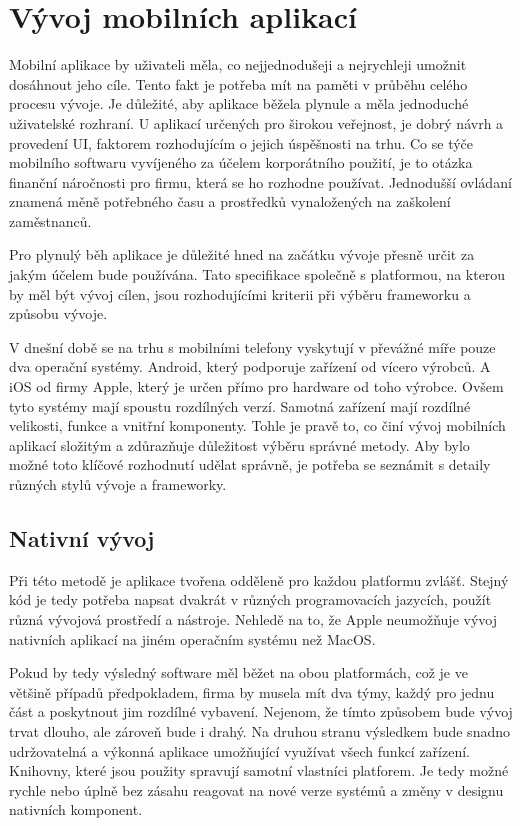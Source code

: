 \documentclass[
  biblatex,
  glossaries,
  index
]{kidiplom}
\begin{document}
\section{Vývoj mobilních aplikací}
Mobilní aplikace by uživateli měla, co nejjednodušeji a nejrychleji umožnit dosáhnout jeho cíle. Tento fakt je potřeba mít na paměti v průběhu celého procesu vývoje. Je důležité, aby aplikace běžela plynule a měla jednoduché uživatelské rozhraní. U aplikací určených pro širokou veřejnost, je dobrý návrh a provedení UI, faktorem rozhodujícím o jejich úspěšnosti na trhu. Co se týče mobilního softwaru vyvíjeného za účelem korporátního použití, je to otázka finanční náročnosti pro firmu, která se ho rozhodne používat. Jednodušší ovládaní znamená měně potřebného času a prostředků vynaložených na zaškolení zaměstnanců.

Pro plynulý běh aplikace je důležité hned na začátku vývoje přesně určit
 za jakým účelem bude používána. Tato specifikace společně s platformou, 
 na kterou by měl být vývoj cílen, jsou rozhodujícími kriterii při výběru frameworku a způsobu vývoje.

V dnešní době se na trhu s mobilními telefony vyskytují v převážné míře pouze dva operační systémy. Android, který podporuje zařízení od vícero výrobců. A iOS od firmy Apple, který je určen přímo pro hardware od toho výrobce. Ovšem tyto systémy mají spoustu rozdílných verzí. Samotná zařízení mají rozdílné velikosti, funkce a vnitřní komponenty. Tohle je pravě to, co činí vývoj mobilních aplikací složitým a zdůrazňuje důležitost výběru správné metody. Aby bylo možné toto klíčové rozhodnutí udělat správně, je potřeba se seznámit s detaily různých stylů vývoje a frameworky.

\subsection{Nativní vývoj}
Při této metodě je aplikace tvořena odděleně pro každou platformu zvlášť. Stejný kód je tedy potřeba napsat dvakrát v různých programovacích jazycích, použít různá vývojová prostředí a nástroje. Nehledě na to, že Apple neumožňuje vývoj nativních aplikací na jiném operačním systému než MacOS. 

Pokud by tedy výsledný software měl běžet na obou platformách, což je ve většině případů předpokladem, firma by musela mít dva týmy, každý pro jednu část a poskytnout jim rozdílné vybavení. Nejenom, že tímto způsobem bude vývoj trvat dlouho, ale zároveň bude i drahý. Na druhou stranu výsledkem bude snadno udržovatelná a výkonná aplikace umožňující využívat všech funkcí zařízení. Knihovny, které jsou použity spravují samotní vlastníci platforem. Je tedy možné rychle nebo úplně bez zásahu reagovat na nové verze systémů a změny v designu nativních komponent. 
\end{document}
